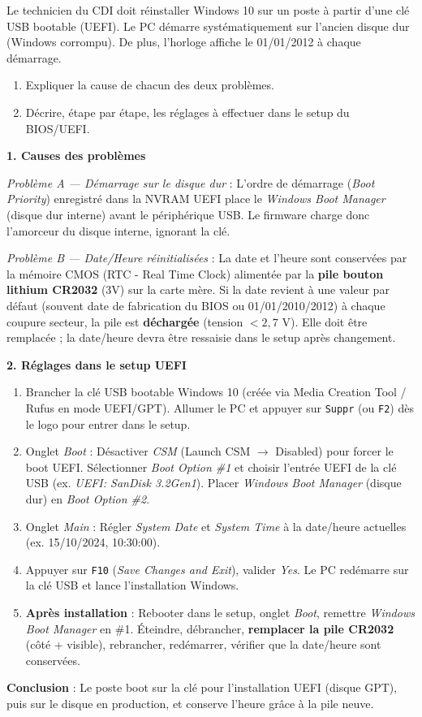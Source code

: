 \documentclass[11pt]{article}
\newcommand{\cle}[1]{{\popxbold\color{popdark}#1}}
\begin{document}
\begin{exoresolu}
Le technicien du CDI doit réinstaller Windows 10 sur un poste à partir d'une clé USB bootable (UEFI). Le PC démarre systématiquement sur l'ancien disque dur (Windows corrompu). De plus, l'horloge affiche le 01/01/2012 à chaque démarrage.
\begin{enumerate}
\item Expliquer la cause de chacun des deux problèmes.
\item Décrire, étape par étape, les réglages à effectuer dans le setup du BIOS/UEFI.
\end{enumerate}
\tcblower
\textbf{1. Causes des problèmes}

\emph{Problème A — Démarrage sur le disque dur} : L'ordre de démarrage (\emph{Boot Priority}) enregistré dans la NVRAM UEFI place le \emph{Windows Boot Manager} (disque dur interne) avant le périphérique USB. Le firmware charge donc l'amorceur du disque interne, ignorant la clé.

\emph{Problème B — Date/Heure réinitialisées} : La date et l'heure sont conservées par la mémoire \cle{CMOS} (RTC - Real Time Clock) alimentée par la \textbf{pile bouton lithium CR2032} (3V) sur la carte mère. Si la date revient à une valeur par défaut (souvent date de fabrication du BIOS ou 01/01/2010/2012) à chaque coupure secteur, la pile est \textbf{déchargée} (tension $< 2,7$ V). Elle doit être remplacée ; la date/heure devra être ressaisie dans le setup après changement.

\textbf{2. Réglages dans le setup UEFI}
\begin{enumerate}
\item Brancher la clé USB bootable Windows 10 (créée via Media Creation Tool / Rufus en mode UEFI/GPT). Allumer le PC et appuyer sur \texttt{Suppr} (ou \texttt{F2}) dès le logo pour entrer dans le setup.
\item Onglet \emph{Boot} : Désactiver \emph{CSM} (Launch CSM $\rightarrow$ Disabled) pour forcer le boot UEFI. Sélectionner \emph{Boot Option \#1} et choisir l'entrée UEFI de la clé USB (ex. \emph{UEFI: SanDisk 3.2Gen1}). Placer \emph{Windows Boot Manager} (disque dur) en \emph{Boot Option \#2}.
\item Onglet \emph{Main} : Régler \emph{System Date} et \emph{System Time} à la date/heure actuelles (ex. 15/10/2024, 10:30:00).
\item Appuyer sur \texttt{F10} (\emph{Save Changes and Exit}), valider \emph{Yes}. Le PC redémarre sur la clé USB et lance l'installation Windows.
\item \textbf{Après installation} : Rebooter dans le setup, onglet \emph{Boot}, remettre \emph{Windows Boot Manager} en \#1. Éteindre, débrancher, \textbf{remplacer la pile CR2032} (côté + visible), rebrancher, redémarrer, vérifier que la date/heure sont conservées.
\end{enumerate}
\textbf{Conclusion} : Le poste boot sur la clé pour l'installation UEFI (disque GPT), puis sur le disque en production, et conserve l'heure grâce à la pile neuve.
\end{exoresolu}
\end{document}
